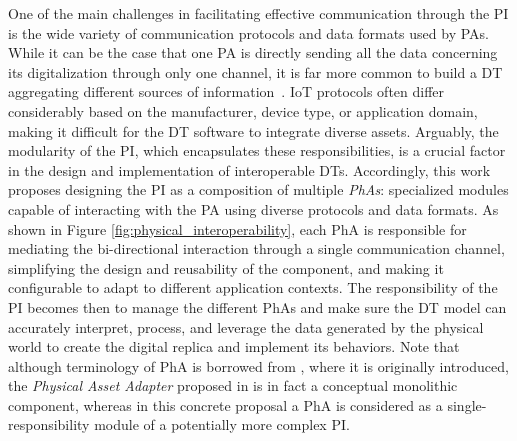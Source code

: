 One of the main challenges in facilitating effective communication through the \ac{PI} is the wide variety of communication protocols and data formats used by \acp{PA}.
%
While it can be the case that one \ac{PA} is directly sending all the data concerning its digitalization through only one channel,
it is far more common to build a \ac{DT} aggregating different sources of information~\cite{qi2018dt-and-bigdata}.
%
\ac{IoT} protocols often differ considerably based on the manufacturer, device type, or application domain, making it difficult for the \ac{DT} software to integrate diverse assets.
%
Arguably, the modularity of the \ac{PI}, which encapsulates these responsibilities, is a crucial factor in the design and implementation of interoperable \acp{DT}.
%
Accordingly, this work proposes designing the \ac{PI} as a composition of multiple \emph{\acp{PhA}}: specialized modules capable of interacting with the \ac{PA} using diverse protocols and data formats.
%
As shown in Figure \ref{fig:physical_interoperability}, each \ac{PhA} is responsible for mediating the bi-directional interaction through a single communication channel, simplifying the design and reusability of the component, and making it configurable to adapt to different application contexts.
%
The responsibility of the \ac{PI} becomes then to manage the different \acp{PhA} and make sure the \ac{DT} model can accurately interpret, process, and leverage the data generated by the physical world to create the digital replica and implement its behaviors.
%
Note that although terminology of \ac{PhA} is borrowed from \cite{web-of-dt-ricci-2022}, where it is originally introduced, the \emph{Physical Asset Adapter} proposed in \cite{web-of-dt-ricci-2022} is in fact a conceptual monolithic component, whereas in this concrete proposal a \ac{PhA} is considered as a single-responsibility module of a potentially more complex \ac{PI}.


